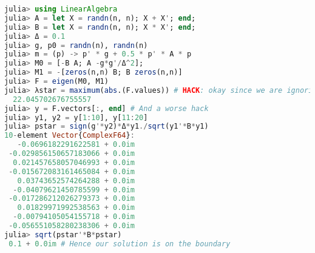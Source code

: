 \documentclass[10pt]{article}
\begin{document}
\begin{solution}
    \newpage
    
\lstset{language=julia}
    \begin{lstlisting}[language=julia, caption={Implementation of Algorithm 5.1 step 2}]
julia> using LinearAlgebra
julia> A = let X = randn(n, n); X + X'; end; 
julia> B = let X = randn(n, n); X * X'; end;
julia> Δ = 0.1
julia> g, p0 = randn(n), randn(n)
julia> m = (p) -> p' * g + 0.5 * p' * A * p
julia> M0 = [-B A; A -g*g'/Δ^2];
julia> M1 = -[zeros(n,n) B; B zeros(n,n)]
julia> F = eigen(M0, M1)
julia> λstar = maximum(abs.(F.values)) # HACK: okay since we are ignoring the hard case
  22.045702676755557
julia> y = F.vectors[:, end] # And a worse hack
julia> y1, y2 = y[1:10], y[11:20]
julia> pstar = sign(g'*y2)*Δ*y1./sqrt(y1'*B*y1)
10-element Vector{ComplexF64}:
   -0.0696182291622581 + 0.0im
 -0.029856150657183066 + 0.0im
  0.021457658057046993 + 0.0im
 -0.015672083161465084 + 0.0im
   0.03743652574264288 + 0.0im
  -0.04079621450785599 + 0.0im
 -0.017286212026279373 + 0.0im
   0.01829971992538563 + 0.0im
  -0.00794105054155718 + 0.0im
 -0.056551058280238306 + 0.0im
julia> sqrt(pstar'*B*pstar) 
 0.1 + 0.0im # Hence our solution is on the boundary
\end{lstlisting}
\end{solution}
\end{document}
